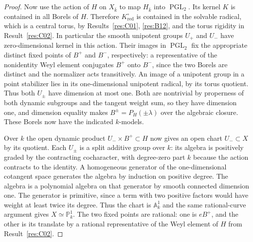 \documentclass[11pt,a4paper,openany,oneside]{book}
\theoremstyle{resultstyle}
\theoremstyle{definition}
\numberwithin{equation}{chapter}
\begin{document}
\begin{proof}
Now use the action of \(H\) on \(X_{\bar k}\) to map
\(H_{\bar k}\) into \(\operatorname{PGL}_2\).
Its kernel \(K\) is contained in all Borels of \(H\).
Therefore \(K_{\mathrm{red}}^\circ\) is contained in the
solvable radical, which is a central torus, by
Results~\ref{res:C01}, \ref{res:B12}, and the torus
rigidity in Result~\ref{res:C02}. In particular the smooth
unipotent groups \(U_+\) and \(U_-\) have zero-dimensional
kernel in this action. Their images in
\(\operatorname{PGL}_2\) fix the appropriate distinct fixed
points of \(B^+\) and \(B^-\), respectively:
a representative of the nonidentity Weyl element conjugates
\(B^+\) onto \(B^-\), since the two Borels are distinct
and the normalizer acts transitively.
An image of a unipotent group in a point stabilizer lies in its
one-dimensional unipotent radical, by its torus quotient.
Thus both \(U_\pm\) have dimension at most one. Both are nontrivial
by properness of both dynamic subgroups and the tangent weight
sum, so they have dimension one, and dimension equality
makes \(B^\pm=P_H(\pm\lambda)\) over the algebraic closure.
These Borels now have the indicated \(k\)-models.

Over \(k\) the open dynamic product \(U_-\times B^+\subset H\)
now gives an open chart \(U_-\subset X\) by its quotient.
Each \(U_\pm\) is a split additive group over \(k\):
its algebra is positively graded by the contracting
cocharacter, with degree-zero part \(k\) because the action
contracts to the identity. A homogeneous generator of the
one-dimensional cotangent space generates the algebra by
induction on positive degree. The algebra is a polynomial
algebra on that generator by smooth connected dimension one.
The generator is primitive, since a term with two positive
factors would have weight at least twice its degree. Thus
the chart is \(\mathbb A^1_k\) and the same rational-curve
argument gives \(X\simeq\mathbb P^1_k\).
The two fixed points are rational: one is \(eB^+\), and the
other is its translate by a rational representative of the
Weyl element of \(H\) from Result~\ref{res:C02}.


\end{proof}
\end{document}
